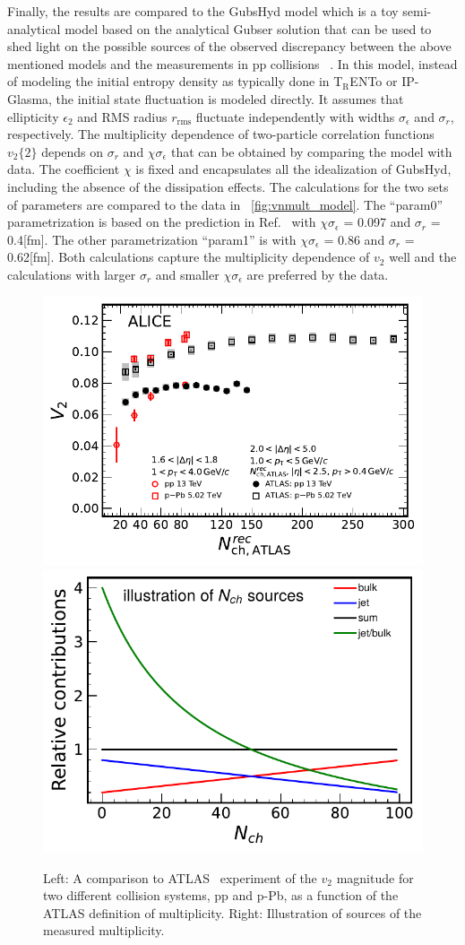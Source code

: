 Finally, the results are compared to the GubsHyd model which is a toy semi-analytical model based on the analytical Gubser solution that can be used to shed light on the possible sources of the observed discrepancy between the above mentioned models and the measurements in pp collisions ~\cite{Taghavi:2019mqz}. In this model, instead of modeling the initial entropy density as typically done in T$_{\text{R}}$ENTo or IP-Glasma, the initial state fluctuation  is modeled directly. It assumes that ellipticity $\epsilon_{2}$ and RMS radius $r_{\text{rms}}$ fluctuate independently with widths $\sigma_{\epsilon}$
 and $\sigma_{r}$, respectively. The multiplicity dependence of two-particle correlation functions $v_2\{2\}$ depends on $\sigma_{r}$ and  $\chi\sigma_{\epsilon}$ that can be obtained by comparing the model with data. The coefficient $\chi$ is fixed and encapsulates all the idealization of GubsHyd, including the absence of the dissipation effects. The calculations for the two sets of parameters are compared
to the data in ~\ref{fig:vnmult_model}. The “param0” parametrization is based on the prediction in Ref.~\cite{Taghavi:2019mqz} with $\chi \sigma_{\epsilon}$ = 0.097 and $\sigma_{r}$ = 0.4[fm]. The other parametrization “param1” is with $\chi \sigma_{\epsilon}$ = 0.86 and $\sigma_{r}$ = 0.62[fm]. Both calculations capture the multiplicity dependence of $v_2$ well and the calculations with larger $\sigma_{r}$ and smaller $\chi \sigma_{\epsilon}$ are preferred by the data.
 
%
\begin{figure}[h!]
	\centering
	\includegraphics[width=0.45 \textwidth]{figures/Fig7_v2Mult_allSystemsATLAS.pdf} 
	\includegraphics[width=0.425
	\textwidth]{figures/IllustrationNchSources.pdf} 
	\caption{Left: A comparison to ATLAS~\cite{Aaboud:2016yar} experiment of the $v_2$ magnitude for two different collision systems, pp and p-Pb, as a function of the ATLAS definition of multiplicity. Right: Illustration of sources of the measured multiplicity.} 
	\label{fig:v2multATLAS}
\end{figure}

